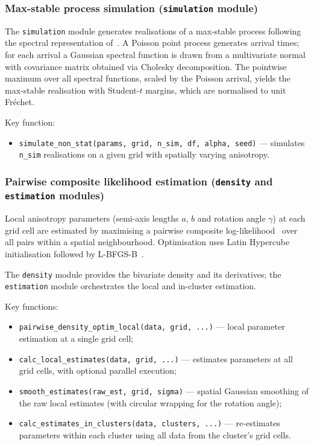 \documentclass[a4paper]{elsarticle}
\begin{document}
\subsubsection{Max-stable process simulation (\texttt{simulation} module)}

The \texttt{simulation} module generates realisations of a
max-stable process following the spectral
representation of~\cite{schlather2002}.
A Poisson point process generates arrival times; for each arrival a
Gaussian spectral function is drawn from a multivariate normal with
covariance matrix obtained via Cholesky decomposition.
The pointwise maximum over all spectral functions, scaled by the
Poisson arrival, yields the max-stable realisation with Student-$t$
margins, which are normalised to unit Fr\'{e}chet.

Key function:
\begin{itemize}
\item \texttt{simulate\_non\_stat(params, grid, n\_sim, df, alpha,
  seed)} --- simulates \texttt{n\_sim} realisations on a given grid
  with spatially varying anisotropy.
\end{itemize}

\subsubsection{Pairwise composite likelihood estimation (\texttt{density} and \texttt{estimation} modules)}

Local anisotropy parameters (semi-axis lengths $a$, $b$ and rotation
angle $\gamma$) at each grid cell are estimated by maximising a
pairwise composite log-likelihood~\cite{padoan2010} over all pairs
within a spatial neighbourhood.  Optimisation uses Latin Hypercube
initialisation followed by L-BFGS-B~\cite{byrd1995}.

The \texttt{density} module provides the bivariate density and its
derivatives; the \texttt{estimation} module orchestrates the local
and in-cluster estimation.

Key functions:
\begin{itemize}
\item \texttt{pairwise\_density\_optim\_local(data, grid, ...)} ---
  local parameter estimation at a single grid cell;
\item \texttt{calc\_local\_estimates(data, grid, ...)} ---
  estimates parameters at all grid cells, with optional parallel
  execution;
\item \texttt{smooth\_estimates(raw\_est, grid, sigma)} ---
  spatial Gaussian smoothing of the raw local estimates (with circular
  wrapping for the rotation angle);
\item \texttt{calc\_estimates\_in\_clusters(data, clusters, ...)} ---
  re-estimates parameters within each cluster using all data from
  the cluster's grid cells.
\end{itemize}
\end{document}
